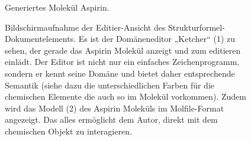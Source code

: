  
\begin{figure}[h!]
\centering
{}
\caption{ Generiertes Molekül Aspirin. }\label{Aspirin}
\end{figure}
 
\begin{figure}[h!]
\centering
{}
\caption[Bildschirmaufnahme Strukturformel-Dokumentelement]{ Bildschirmaufnahme der Editier-Ansicht des Strukturformel-Dokumentelements. Es ist der Domäneneditor „Ketcher“ (1) zu sehen, der gerade das Aspirin Molekül anzeigt und zum editieren einlädt. Der Editor ist nicht nur ein einfaches Zeichenprogramm, sondern er kennt seine Domäne und bietet daher entsprechende Semantik (siehe dazu die unterschiedlichen Farben für die chemischen Elemente die auch so im Molekül vorkommen). Zudem wird das Modell (2) des Aspirin Moleküls im Molfile-Format angezeigt. Das alles ermöglicht dem Autor, direkt mit dem chemischen Objekt zu interagieren. }\label{chemieeditieren}
\end{figure}
 

